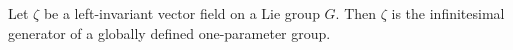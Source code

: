 Let $\zeta$ be a left-invariant vector field on a Lie group $G$. Then $\zeta$ is the infinitesimal generator of a globally defined one-parameter group.
